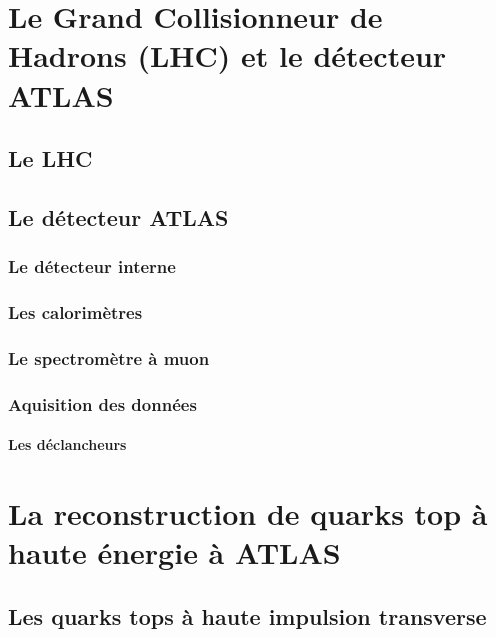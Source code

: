 \documentclass[12pt,canadien]{report}
\begin{document}
\singlespacing{}
\chapter{Le Grand Collisionneur de Hadrons (LHC) et le détecteur
  ATLAS}
\label{sec:lhc_atlas}
\doublespacing{}

\section{Le LHC}
\label{sec:lhc_atlas:lhc}

\section{Le détecteur ATLAS}
\label{sec:lhc_atlas:atlas}

\subsection{Le détecteur interne}
\label{sec:lhc_atlas:atlas:indet}

\subsection{Les calorimètres}
\label{sec:lhc_atlas:atlas:calo}

\subsection{Le spectromètre à muon}
\label{sec:lhc_atlas:atlas:mu}

\subsection{Aquisition des données}
\label{sec:lhc_atlas:atlas:daq}

\subsubsection{Les déclancheurs}
\label{sec:lhc_atlas:atlas:daq:trig}




\singlespacing{}
\chapter{La reconstruction de quarks top à haute énergie à ATLAS}
\label{sec:top}
\doublespacing{}

\section{Les quarks tops à haute impulsion transverse}
\label{sec:top:boosted}
\end{document}
